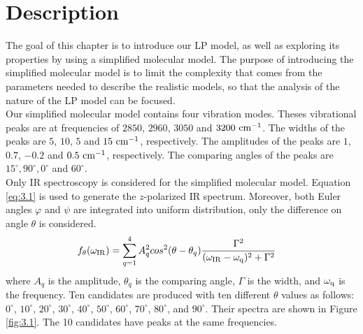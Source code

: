  \label{ch:3}

\section{Description}
The goal of this chapter is to introduce our LP model, as well as exploring its properties by using a simplified molecular model. The purpose of introducing the simplified molecular model is to limit the complexity that comes from the parameters needed to describe the realistic models, so that the analysis of the nature of the LP model can be focused. \\

Our simplified molecular model contains four vibration modes. Theses vibrational peaks are at frequencies of $2850$, $2960$, $3050$ and $3200~\rm cm^{-1}$. The widths of the peaks are $5$, $10$, $5$ and $15~\rm cm^{-1}$, respectively. The amplitudes of the peaks are $1$, $0.7$, $-0.2$ and $0.5~\rm cm^{-1}$, respectively. The comparing angles of the peaks are $15^{\circ}, 90^{\circ}, 0^{\circ}$ and $60^{\circ}$. \\

Only IR spectroscopy is considered for the simplified molecular model. Equation \ref{eq:3.1} is used to generate the $z$-polarized IR spectrum. Moreover, both Euler angles $\varphi$ and $\psi$ are integrated into uniform distribution, only the difference on angle $\theta$ is considered. \\

\begin{eqnarray} \label{eq:3.1}
& f_{\theta}(\omega_{\rm IR}) = \displaystyle\sum^{4}_{q=1} A_q^2 cos^2(\theta - \theta_q)\frac{\Gamma^2}{(\omega_{\rm IR}- \omega_{\rm q})^2 + \Gamma^2} 
\end{eqnarray}
where $A_{q}$ is the amplitude, $\theta_{q}$ is the comparing angle, $\Gamma$ is the width, and $\omega_{\rm q}$ is the frequency. Ten candidates are produced with ten different $\theta$ values as follows: $0^{\circ}$, $10^{\circ}$, $20^{\circ}$, $30^{\circ}$, $40^{\circ}$, $50^{\circ}$, $60^{\circ}$, $70^{\circ}$, $80^{\circ}$, and $90^{\circ}$. Their spectra are shown in Figure \ref{fig:3.1}. The 10 candidates have peaks at the same frequencies. \\

